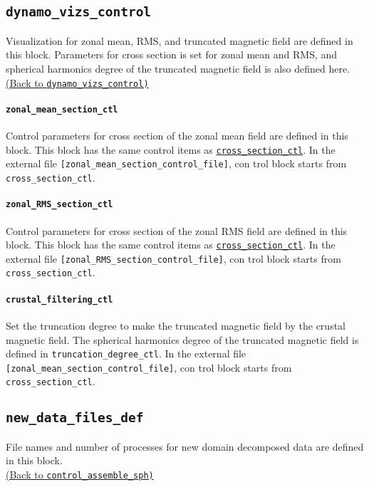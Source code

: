 \subsection{\tt dynamo\_vizs\_control}
\label{href_t:dynamo_vizs_control}
Visualization for zonal mean, RMS, and truncated magnetic field are defined in this block. Parameters for cross section is set for zonal mean and RMS, and spherical harmonics degree of the truncated magnetic field is also defined here. \\
\hyperref[href_i:dynamo_vizs_control]{(Back to {\tt dynamo\_vizs\_control)}}

%
%
\paragraph{\tt zonal\_mean\_section\_ctl}
\label{href_t:zonal_mean_section_ctl}
Control parameters for cross section of the zonal mean field are defined in this block. This block has the same control items as \hyperref[href_i:cross_section_ctl]{\tt cross\_section\_ctl}. In the external file {\tt [zonal\_mean\_section\_control\_file]}, con trol block starts from {\tt cross\_section\_ctl}.


\paragraph{\tt zonal\_RMS\_section\_ctl}
\label{href_t:zonal_RMS_section_ctl}
Control parameters for cross section of the zonal RMS field are defined in this block. This block has the same control items as \hyperref[href_i:cross_section_ctl]{\tt cross\_section\_ctl}. In the external file {\tt [zonal\_RMS\_section\_control\_file]}, con trol block starts from {\tt cross\_section\_ctl}.

\paragraph{\tt crustal\_filtering\_ctl}
\label{href_t:crustal_filtering_ctl}
Set the truncation degree to make the truncated magnetic field by the crustal magnetic field. The spherical harmonics degree of the truncated magnetic field is defined in {\tt truncation\_degree\_ctl}. In the external file {\tt [zonal\_mean\_section\_control\_file]}, con trol block starts from {\tt cross\_section\_ctl}.

%

\subsection{\tt new\_data\_files\_def}
\label{href_t:new_data_files_def}
File names and number of processes for new domain decomposed data are defined in this block. \\
\hyperref[href_i:new_data_files_def]{(Back to {\tt control\_assemble\_sph)}}

